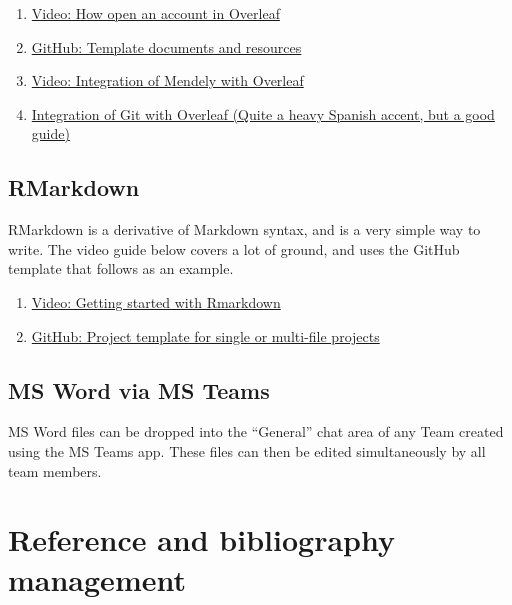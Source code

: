 \documentclass[
]{book}
\begin{document}
\begin{enumerate}
\def\labelenumi{\arabic{enumi}.}
\item
  \href{https://www.youtube.com/watch?v=g8Ejj0T0yG4}{Video: How open an account in Overleaf}
\item
  \href{https://github.com/robabsmith/Example-project}{GitHub: Template documents and resources}
\item
  \href{https://www.loom.com/share/6d0d4f7108f041d082253c636a52dee8}{Video: Integration of Mendely with Overleaf}
\item
  \href{https://youtu.be/BAt5xYP70u0}{Integration of Git with Overleaf (Quite a heavy Spanish accent, but a good guide)}
\end{enumerate}

\hypertarget{rmarkdown}{%
\section{RMarkdown}\label{rmarkdown}}

RMarkdown is a derivative of Markdown syntax, and is a very simple way to write. The video guide below covers a lot of ground, and uses the GitHub template that follows as an example.

\begin{enumerate}
\def\labelenumi{\arabic{enumi}.}
\item
  \href{https://www.loom.com/share/407ae8d0f00e4a05941a9a09e5e13f96}{Video: Getting started with Rmarkdown}
\item
  \href{https://github.com/robabsmith/Rmarkdown-project-template}{GitHub: Project template for single or multi-file projects}
\end{enumerate}

\hypertarget{ms-word-via-ms-teams}{%
\section{MS Word via MS Teams}\label{ms-word-via-ms-teams}}

MS Word files can be dropped into the ``General'' chat area of any Team created using the MS Teams app. These files can then be edited simultaneously by all team members.

\hypertarget{reference-and-bibliography-management}{%
\chapter{Reference and bibliography management}\label{reference-and-bibliography-management}}
\end{document}
